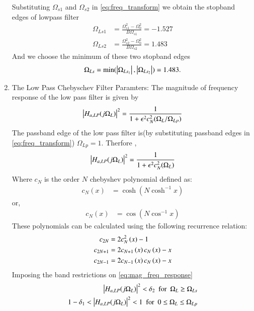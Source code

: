 \documentclass{article}
\begin{document}
\begin{enumerate}
Substituting $\Omega_{s1}$ and $\Omega_{s2}$ in \eqref{eq:freq_transform} we obtain the stopband edges of lowpass filter
\begin{align}
    \Omega_{Ls1} &= \frac{\Omega_{s1}^2 - \Omega_0^2}{B\Omega_{s1}} = -1.527\\
    \Omega_{Ls2} &= \frac{\Omega_{s2}^2 - \Omega_0^2}{B\Omega_{s2}} = 1.483
\end{align}
And we choose the minimum of these two stopband edges
\begin{align}
    \Omega_{Ls} = \mbox{min}(\left\vert \Omega_{Ls_1}\right\vert,\left\vert \Omega_{Ls_2}\right\vert) = 1.483.
\end{align}
\item {The Low Pass Chebyschev Filter Paramters:} The magnitude of frequency response of the low pass filter is given by
\begin{align}
    \left\vert H_{a,LP}(j\Omega_L)\right\vert^2 = \frac{1}{1 + \epsilon^2c_N^2(\Omega_L/\Omega_{Lp})} \label{eq:mag_freq_response}
\end{align}
The passband edge of the low pass filter is(by substituting passband edges in \eqref{eq:freq_transform}) $\Omega_{Lp}=1$.
Therfore ,
\begin{align}
    \left\vert H_{a,LP}(j\Omega_L)\right\vert^2 = \frac{1}{1 + \epsilon^2c_N^2(\Omega_L)} \label{eq:specification}
\end{align}
Where $c_N$ is the order $N$ chebyshev polynomial defined as:
\begin{align}
    c_N(x) &= \cosh(N \cosh^{-1}x)
\end{align}
or,
\begin{align}
    c_N(x) &= \cos(N \cos^{-1}x)
\end{align}
These polynomials can be calculated using the following recurrence relation:
\begin{align}
    c_{2N} &= 2c_{N}^2\left(x\right) - 1\\
    c_{2N + 1} &= 2c_{N + 1}\left(x\right)c_{N}\left(x\right) - x\\
    c_{2N - 1} &= 2c_{N - 1}\left(x\right)c_{N}\left(x\right) - x \label{eq:cheby_poly_relation}
\end{align}
Imposing the band restrictions on \eqref{eq:mag_freq_response} \\
\begin{align}
    \abs{ H_{a,LP}(j\Omega_L)}^2 < \delta_2 \hspace{5pt}\text{for}\hspace{5pt} \Omega_L \geq \Omega_{Ls}\\
    1 - \delta_1 < \abs{H_{a,LP}(j\Omega_L)}^2 < 1 \hspace{5pt}\text{for}\hspace{5pt} 0 \leq \Omega_L \leq \Omega_{Lp}

\end{align}
\end{enumerate}
\end{document}
